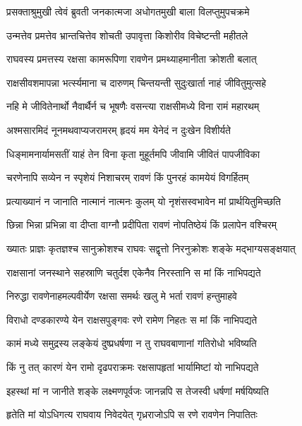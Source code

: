 
\twolineshloka
{प्रसक्ताश्रुमुखी त्वेवं ब्रुवती जनकात्मजा}
{अधोगतमुखी बाला विलप्तुमुपचक्रमे} %

\twolineshloka
{उन्मत्तेव प्रमत्तेव भ्रान्तचित्तेव शोचती}
{उपावृत्ता किशोरीव विचेष्टन्ती महीतले} %

\twolineshloka
{राघवस्य प्रमत्तस्य रक्षसा कामरूपिणा}
{रावणेन प्रमथ्याहमानीता क्रोशती बलात्} %

\twolineshloka
{राक्षसीवशमापन्ना भर्त्स्यमाना च दारुणम्}
{चिन्तयन्ती सुदुःखार्ता नाहं जीवितुमुत्सहे} %

\twolineshloka
{नहि मे जीवितेनार्थो नैवार्थैर्न च भूषणैः}
{वसन्त्या राक्षसीमध्ये विना रामं महारथम्} %

\twolineshloka
{अश्मसारमिदं नूनमथवाप्यजरामरम्}
{हृदयं मम येनेदं न दुःखेन विशीर्यते} %

\twolineshloka
{धिङ्मामनार्यामसतीं याहं तेन विना कृता}
{मुहूर्तमपि जीवामि जीवितं पापजीविका} %

\twolineshloka
{चरणेनापि सव्येन न स्पृशेयं निशाचरम्}
{रावणं किं पुनरहं कामयेयं विगर्हितम्} %

\twolineshloka
{प्रत्याख्यानं न जानाति नात्मानं नात्मनः कुलम्}
{यो नृशंसस्वभावेन मां प्रार्थयितुमिच्छति} %

\twolineshloka
{छिन्ना भिन्ना प्रभिन्ना वा दीप्ता वाग्नौ प्रदीपिता}
{रावणं नोपतिष्ठेयं किं प्रलापेन वश्चिरम्} %

\twolineshloka
{ख्यातः प्राज्ञः कृतज्ञश्च सानुक्रोशश्च राघवः}
{सद्वृत्तो निरनुक्रोशः शङ्के मद्भाग्यसङ्क्षयात्} %

\twolineshloka
{राक्षसानां जनस्थाने सहस्राणि चतुर्दश}
{एकेनैव निरस्तानि स मां किं नाभिपद्यते} %

\twolineshloka
{निरुद्धा रावणेनाहमल्पवीर्येण रक्षसा}
{समर्थः खलु मे भर्ता रावणं हन्तुमाहवे} %

\twolineshloka
{विराधो दण्डकारण्ये येन राक्षसपुङ्गवः}
{रणे रामेण निहतः स मां किं नाभिपद्यते} %

\twolineshloka
{कामं मध्ये समुद्रस्य लङ्केयं दुष्प्रधर्षणा}
{न तु राघवबाणानां गतिरोधो भविष्यति} %

\twolineshloka
{किं नु तत् कारणं येन रामो दृढपराक्रमः}
{रक्षसापहृतां भार्यामिष्टां यो नाभिपद्यते} %

\twolineshloka
{इहस्थां मां न जानीते शङ्के लक्ष्मणपूर्वजः}
{जानन्नपि स तेजस्वी धर्षणां मर्षयिष्यति} %

\twolineshloka
{हृतेति मां योऽधिगत्य राघवाय निवेदयेत्}
{गृध्रराजोऽपि स रणे रावणेन निपातितः} %

